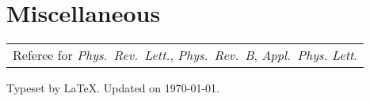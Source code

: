 \documentclass[a4paper, 11pt, DIV=15,headings=normal]{scrartcl}
\begin{document}
\section*{Miscellaneous}
\begin{tabular}{l}
Referee for \textit{Phys.\ Rev.\ Lett.}, \textit{Phys.\ Rev.\ B}, \textit{Appl.\ Phys. Lett}.
\end{tabular}

\begin{refsegment}
\AtNextBibliography{\small}
\nocite{Chen2019,Chen2016,Chen2015,Chen2017,Chen2018a}
\printbibliography[segment=1, heading=bibselect, title={Selected Publications},env=bibselect]
\end{refsegment}

\begin{refsegment}
\nocite{*}
\printbibliography[segment=2, resetnumbers=true, title={Publications in Chronological Order}]
\end{refsegment}

\vspace{6mm}

\begin{minipage}{0.4\linewidth}
\scriptsize Typeset by \LaTeX. Updated on \today.
\end{minipage}
\end{document}

